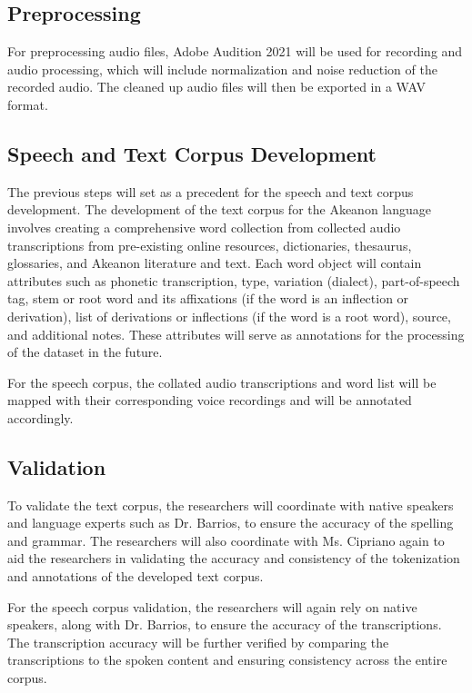 \subsection{Preprocessing}
For preprocessing audio files, Adobe Audition 2021 will be used for recording and audio processing, which will include normalization and noise reduction of the recorded audio. The cleaned up audio files will then be exported in a WAV format.

\subsection{Speech and Text Corpus Development}
The previous steps will set as a precedent for the speech and text corpus development. The development of the text corpus for the Akeanon language involves creating a comprehensive word collection from collected audio transcriptions from pre-existing online resources, dictionaries, thesaurus, glossaries, and Akeanon literature and text. Each word object will contain attributes such as phonetic transcription, type, variation (dialect), part-of-speech tag, stem or root word and its affixations (if the word is an inflection or derivation), list of derivations or inflections (if the word is a root word), source, and additional notes. These attributes will serve as annotations for the processing of the dataset in the future.

For the speech corpus, the collated audio transcriptions and word list will be mapped with their corresponding voice recordings and will be annotated accordingly.

\subsection{Validation}

To validate the text corpus, the researchers will coordinate with native speakers and language experts such as Dr. Barrios, to ensure the accuracy of the spelling and grammar. The researchers will also coordinate with Ms. Cipriano again to aid the researchers in validating the accuracy and consistency of the tokenization and annotations of the developed text corpus.

For the speech corpus validation, the researchers will again rely on native speakers, along with Dr. Barrios, to ensure the accuracy of the transcriptions. The transcription accuracy will be further verified by comparing the transcriptions to the spoken content and ensuring consistency across the entire corpus.

